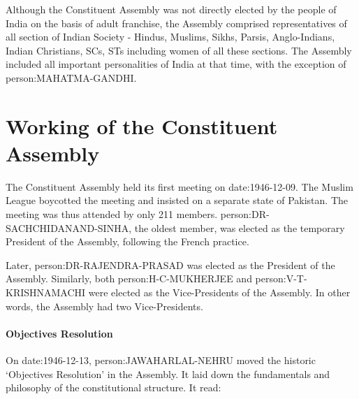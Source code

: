 Although the Constituent Assembly was not directly elected by the people of India on the basis of adult franchise, the Assembly comprised representatives of all section of Indian Society - Hindus, Muslims, Sikhs, Parsis, Anglo-Indians, Indian Christians, SCs, STs including women of all these sections. The Assembly included all important personalities of India at that time, with the exception of \gls{person:MAHATMA-GANDHI}.

\section{Working of the Constituent Assembly}

The Constituent Assembly held its first meeting on \gls{date:1946-12-09}. The Muslim League boycotted the meeting and insisted on a separate state of Pakistan. The meeting was thus attended by only 211 members. {\gls{person:DR-SACHCHIDANAND-SINHA}, the oldest member, was elected as the temporary President of the Assembly, following the French practice.}

Later, \gls{person:DR-RAJENDRA-PRASAD} was elected as the President of the Assembly. Similarly, both \gls{person:H-C-MUKHERJEE} and \gls{person:V-T-KRISHNAMACHI} were elected as the Vice-Presidents of the Assembly. In other words, the Assembly had two Vice-Presidents.

\paragraph{Objectives Resolution}

On \gls{date:1946-12-13}, \gls{person:JAWAHARLAL-NEHRU} moved the historic `Objectives Resolution' in the Assembly. It laid down the fundamentals and philosophy of the constitutional structure. It read:

